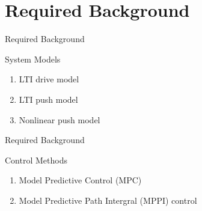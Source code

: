 \section{Required Background}
\begin{frame}[fragile]{Required Background} 
\begin{block}{System Models}
\begin{enumerate}
  \item LTI drive model\pause
  \item LTI push model\pause
  \item Nonlinear push model
\end{enumerate}
\end{block}
\end{frame}

\begin{frame}[fragile]{Required Background} 
\begin{block}{Control Methods}
\begin{enumerate}
  \item Model Predictive Control (MPC)
  \item Model Predictive Path Intergral (MPPI) control
\end{enumerate}
\end{block}



\end{frame}


